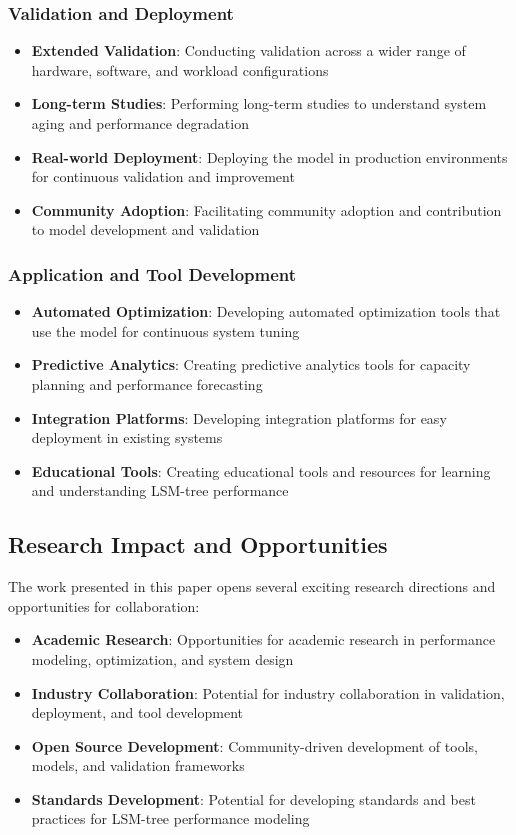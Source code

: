 \documentclass[11pt]{article}
\begin{document}
\subsubsection{Validation and Deployment}
\begin{itemize}
    \item \textbf{Extended Validation}: Conducting validation across a wider range of hardware, software, and workload configurations
    \item \textbf{Long-term Studies}: Performing long-term studies to understand system aging and performance degradation
    \item \textbf{Real-world Deployment}: Deploying the model in production environments for continuous validation and improvement
    \item \textbf{Community Adoption}: Facilitating community adoption and contribution to model development and validation
\end{itemize}

\subsubsection{Application and Tool Development}
\begin{itemize}
    \item \textbf{Automated Optimization}: Developing automated optimization tools that use the model for continuous system tuning
    \item \textbf{Predictive Analytics}: Creating predictive analytics tools for capacity planning and performance forecasting
    \item \textbf{Integration Platforms}: Developing integration platforms for easy deployment in existing systems
    \item \textbf{Educational Tools}: Creating educational tools and resources for learning and understanding LSM-tree performance
\end{itemize}

\subsection{Research Impact and Opportunities}

The work presented in this paper opens several exciting research directions and opportunities for collaboration:

\begin{itemize}
    \item \textbf{Academic Research}: Opportunities for academic research in performance modeling, optimization, and system design
    \item \textbf{Industry Collaboration}: Potential for industry collaboration in validation, deployment, and tool development
    \item \textbf{Open Source Development}: Community-driven development of tools, models, and validation frameworks
    \item \textbf{Standards Development}: Potential for developing standards and best practices for LSM-tree performance modeling
\end{itemize}
\end{document}
